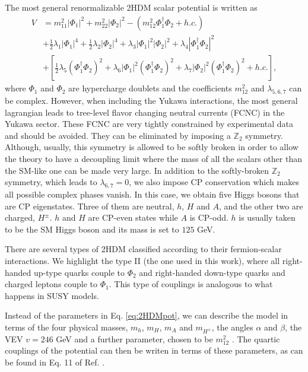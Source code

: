 The most general renormalizable 2HDM scalar potential is written as \cite{2HDMpedro}
\begin{align}
	V&=m_{11}^2 |\Phi_1|^2+m_{22}^2 |\Phi_2|^2-(m_{12}^2 \Phi_1^{\dagger}\Phi_2+h.c.)\nonumber \\
	&+\frac{1}{2}\lambda_1|\Phi_1|^4+\frac{1}{2}\lambda_2|\Phi_2|^4+\lambda_3|\Phi_1|^2|\Phi_2|^2+\lambda_4|\Phi_1^{\dagger}\Phi_2|^2 \nonumber \\
	&+\left[\frac{1}{2}\lambda_5\left(\Phi_1^{\dagger}\Phi_2\right)^2+\lambda_6 |\Phi_1|^2\left(\Phi_1^{\dagger}\Phi_2\right)^2+\lambda_7 |\Phi_2|^2\left(\Phi_1^{\dagger}\Phi_2\right)^2+h.c.\right],	
	\label{eq:2HDMpot}
\end{align}  
where $\Phi_1$ and $\Phi_2$ are hypercharge doublets and the coefficients $m_{12}^2$ and $\lambda_{5,6,7}$ can be complex. However, when including the Yukawa interactions, the most general lagrangian leads to tree-level flavor changing neutral currents (FCNC) in the Yukawa sector. These FCNC are very tightly constrained by experimental data and should be avoided. They can be eliminated by imposing a $\mathbb{Z}_2$ symmetry. Although, usually, this symmetry is allowed to be softly broken in order to allow the theory to have a decoupling limit \cite{2HDMdec} where the mass of all the scalars other than the SM-like one can be made very large. In addition to the softly-broken $\mathbb{Z}_2$ symmetry, which leads to $\lambda_{6,7}=0$, we also impose CP conservation which makes all possible complex phases vanish. In this case, we obtain five Higgs bosons that are CP eigenstates. Three of them are neutral, $h$, $H$ and $A$, and the other two are charged, $H^{\pm}$. $h$ and $H$ are CP-even states while $A$ is CP-odd. $h$ is usually taken to be the SM Higgs boson and its mass is set to $125$ GeV.

There are several types of 2HDM classified according to their fermion-scalar interactions. We highlight the type II (the one used in this work), where all right-handed up-type quarks couple to $\Phi_2$ and right-handed down-type quarks and charged leptons couple to $\Phi_1$. This type of couplings is analogous to what happens in SUSY models. 

Instead of the parameters in Eq. \ref{eq:2HDMpot}, we can describe the model in terms of the four physical masses, $m_h$, $m_H$, $m_A$ and $m_{H^{\pm}}$, the angles $\alpha$ and $\beta$, the VEV $v=246$ GeV and a further parameter, chosen to be $m_{12}^2$ \cite{2HDMpedro}. The quartic couplings of the potential can then be writen in terms of these parameters, as can be found in Eq. 11 of Ref. \cite{2HDMpedro}.

